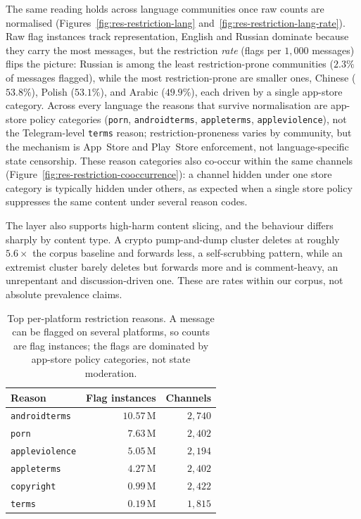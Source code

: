 The same reading holds across language communities once raw counts are normalised (Figures~\ref{fig:res-restriction-lang} and~\ref{fig:res-restriction-lang-rate}). Raw flag instances track representation, English and Russian dominate because they carry the most messages, but the restriction \emph{rate} (flags per $1{,}000$ messages) flips the picture: Russian is among the least restriction-prone communities ($2.3\%$ of messages flagged), while the most restriction-prone are smaller ones, Chinese ($53.8\%$), Polish ($53.1\%$), and Arabic ($49.9\%$), each driven by a single app-store category. Across every language the reasons that survive normalisation are app-store policy categories (\texttt{porn}, \texttt{androidterms}, \texttt{appleterms}, \texttt{appleviolence}), not the Telegram-level \texttt{terms} reason; restriction-proneness varies by community, but the mechanism is App~Store and Play~Store enforcement, not language-specific state censorship. These reason categories also co-occur within the same channels (Figure~\ref{fig:res-restriction-cooccurrence}): a channel hidden under one store category is typically hidden under others, as expected when a single store policy suppresses the same content under several reason codes.

The layer also supports high-harm content slicing, and the behaviour differs sharply by content type. A crypto pump-and-dump cluster deletes at roughly $5.6\times$ the corpus baseline and forwards less, a self-scrubbing pattern, while an extremist cluster barely deletes but forwards more and is comment-heavy, an unrepentant and discussion-driven one. These are rates within our corpus, not absolute prevalence claims.

\begin{table}[htbp]
\centering
\caption[Restriction reasons by flag instances.]{Top per-platform restriction reasons. A message can be flagged on several platforms, so counts are flag instances; the flags are dominated by app-store policy categories, not state moderation.}
\label{tab:res-restriction}
\small
\setlength{\tabcolsep}{6pt}
\begin{tabular}{@{}lrr@{}}
\toprule
\textbf{Reason} & \textbf{Flag instances} & \textbf{Channels} \\
\midrule
\texttt{androidterms}  & $10.57$\,M & $2{,}740$ \\
\texttt{porn}          & $7.63$\,M  & $2{,}402$ \\
\texttt{appleviolence} & $5.05$\,M  & $2{,}194$ \\
\texttt{appleterms}    & $4.27$\,M  & $2{,}402$ \\
\texttt{copyright}     & $0.99$\,M  & $2{,}422$ \\
\texttt{terms}         & $0.19$\,M  & $1{,}815$ \\
\bottomrule
\end{tabular}
\end{table}

